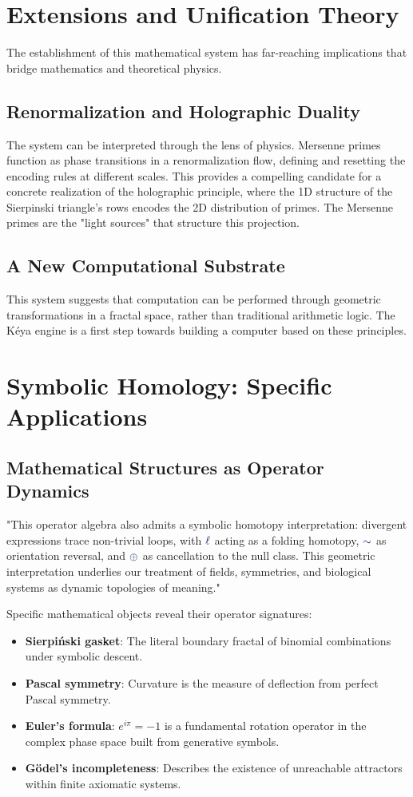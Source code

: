 \section{Extensions and Unification Theory}

The establishment of this mathematical system has far-reaching implications that bridge mathematics and theoretical physics.

\subsection{Renormalization and Holographic Duality}
The system can be interpreted through the lens of physics. Mersenne primes function as phase transitions in a renormalization flow, defining and resetting the encoding rules at different scales. This provides a compelling candidate for a concrete realization of the holographic principle, where the 1D structure of the Sierpinski triangle's rows encodes the 2D distribution of primes. The Mersenne primes are the "light sources" that structure this projection.

\subsection{A New Computational Substrate}
This system suggests that computation can be performed through geometric transformations in a fractal space, rather than traditional arithmetic logic. The Kéya engine is a first step towards building a computer based on these principles.

\section{Symbolic Homology: Specific Applications}

\subsection{Mathematical Structures as Operator Dynamics}
"This operator algebra also admits a symbolic homotopy interpretation: divergent expressions trace non-trivial loops, with $\lha$ acting as a folding homotopy, $\reflec$ as orientation reversal, and $\fuse$ as cancellation to the null class. This geometric interpretation underlies our treatment of fields, symmetries, and biological systems as dynamic topologies of meaning."

Specific mathematical objects reveal their operator signatures:
\begin{itemize}
    \item \textbf{Sierpiński gasket}: The literal boundary fractal of binomial combinations under symbolic descent.
    \item \textbf{Pascal symmetry}: Curvature is the measure of deflection from perfect Pascal symmetry.
    \item \textbf{Euler's formula}: $e^{i\pi} = -1$ is a fundamental rotation operator in the complex phase space built from generative symbols.
    \item \textbf{Gödel's incompleteness}: Describes the existence of unreachable attractors within finite axiomatic systems.
\end{itemize}

